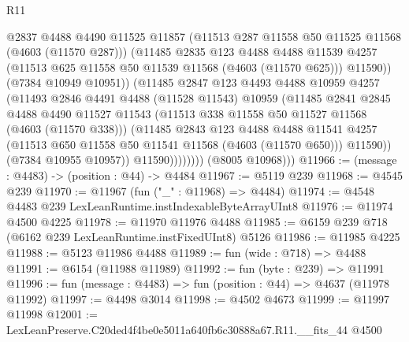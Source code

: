 \begin{lexlean}{R11}
\begin{coremodule}
                          @2837
                          @4488
                          @4490
                          @11525
                          @11857
                          (@11513 @287 @11558 @50 @11525 @11568 (@4603 (@11570 @287)))
                          (@11485
                            @2835
                            @123
                            @4488
                            @4488
                            @11539
                            @4257
                            (@11513 @625 @11558 @50 @11539 @11568 (@4603 (@11570 @625)))
                            @11590))
                        (@7384 @10949 @10951))
                      (@11485
                        @2847
                        @123
                        @4493
                        @4488
                        @10959
                        @4257
                        (@11493
                          @2846
                          @4491
                          @4488
                          (@11528 @11543)
                          @10959
                          (@11485
                            @2841
                            @2845
                            @4488
                            @4490
                            @11527
                            @11543
                            (@11513 @338 @11558 @50 @11527 @11568 (@4603 (@11570 @338)))
                            (@11485
                              @2843
                              @123
                              @4488
                              @4488
                              @11541
                              @4257
                              (@11513 @650 @11558 @50 @11541 @11568 (@4603 (@11570 @650)))
                              @11590))
                          (@7384 @10955 @10957))
                        @11590))))))))
        (@8005 @10968)))
@11966 := (message : @4483) -> (position : @44) -> @4484
@11967 := @5119 @239
@11968 := @4545 @239
@11970 := @11967 (fun ("_" : @11968) => @4484)
@11974 := @4548 @4483 @239 LexLeanRuntime.instIndexableByteArrayUInt8
@11976 := @11974 @4500 @4225
@11978 := @11970 @11976 @4488
@11985 := @6159 @239 @718 (@6162 @239 LexLeanRuntime.instFixedUInt8) @5126
@11986 := @11985 @4225
@11988 := @5123 @11986 @4488
@11989 := fun (wide : @718) => @4488
@11991 := @6154 (@11988 @11989)
@11992 := fun (byte : @239) => @11991
@11996 := fun (message : @4483) => fun (position : @44) => @4637 (@11978 @11992)
@11997 := @4498 @3014
@11998 := @4502 @4673
@11999 := @11997 @11998
@12001 := LexLeanPreserve.C20ded4f4be0e5011a640fb6c30888a67.R11.__fits_44 @4500

\end{coremodule}
\end{lexlean}
